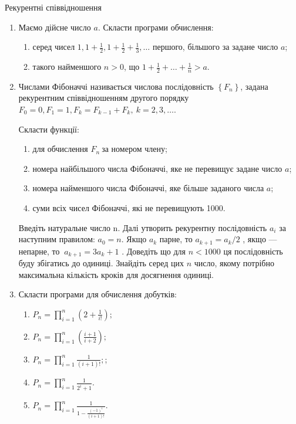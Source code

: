 \documentclass[]{article}
\makeatletter
\newcommand{\xslalph}[1]{\expandafter\@xslalph\csname c@#1\endcsname}
\newcommand{\@xslalph}[1]{%
    \ifcase#1\or а\or б\or в\or г\or д\or e\or є\or ж\or з\or i%
    \or й\or к\or л\or м\or н\or о\or п\or р\or с\or т%
    \or у\or ф\or х\or ц\or ч\or ш\or ю\or я\or аа\or бб\or вв %
    \else\@ctrerr\fi%
}
\makeatother
\begin{document}
Рекурентні співвідношення

\begin{enumerate}
\def\labelenumi{\arabic{enumi})}
\item
  Маємо дійсне число $a$. Скласти програми обчислення:
\begin{enumerate}[label=\xslalph*)]
\item серед чисел
\(1,1 + \frac{1}{2},1 + \frac{1}{2} + \frac{1}{3},\ldots\) першого,
більшого за задане число $a$;

\item такого найменшого $n>0$, що
\(1 + \frac{1}{2} + \ldots + \frac{1}{n} > a.\)

\end{enumerate}

\item
  Числами Фібоначчі називається числова послідовність
  \(\left\{ F_{n} \right\}\), задана рекурентним співвідношенням другого
  порядку
  \(F_{0} = 0,F_{1} = 1,F_{k} = F_{k - 1} + F_{k},\ k = 2,3,\ldots\).

Скласти функції:
\begin{enumerate}[label=\xslalph*)]
\item
для обчислення \(F_{n}\ \)за номером члену;
\item номера найбільшого числа Фібоначчі, яке не перевищує задане число
$a$;
\item номера найменшого числа Фібоначчі, яке більше заданого числа
$a$;
\item суми всіх чисел Фібоначчі, які не перевищують 1000.

\end{enumerate}
Введіть натуральне число n. Далі утворить рекурентну послідовність
\(a_{i}\) за наступним правилом: \(a_{0} = n\). Якщо \(a_{k}\) парне, то
\(a_{k + 1} = a_{k}/2\) , якщо --- непарне,
то \(\ a_{k + 1} = 3a_{k} + 1\) . Доведіть що для $n<1000$ ця
послідовність буду збігатись до одиниці. Знайдіть серед цих $n$ число,
якому потрібно максимальна кількість кроків для досягнення одиниці.

\item
  Скласти програми для обчислення добутків:
\begin{enumerate}[label=\xslalph*)]
\item \(P_{n} = \prod\limits_{i = 1}^{n}\left( 2 + \frac{1}{i!} \right);\) 
\item
\(P_{n} = \prod\limits_{i = 1}^{n}\left( \frac{i + 1}{i + 2} \right);\)
\item
\(P_{n} = \prod\limits_{i = 1}^{n}\frac{1}{(i + 1)!};\); 
\item
\(P_{n} = \prod\limits_{i = 1}^{n}\frac{1}{2^{i} + 1}.\)
\item
\(P_{n} = \prod\limits_{i = 1}^{n}\frac{1}{1 -\frac{(-1)^{i}}{(i+1)!}}.\)


\end{enumerate}
\end{enumerate}
\end{document}
